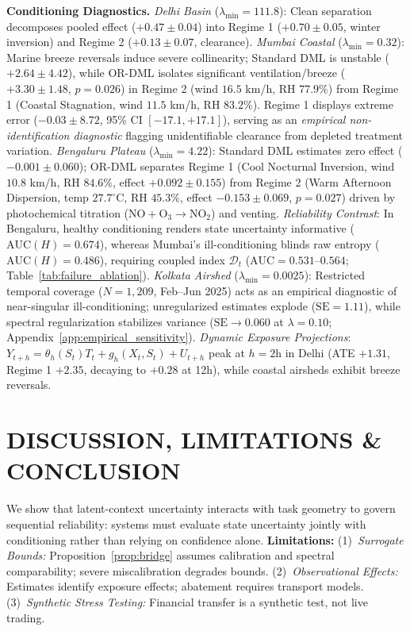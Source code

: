 \documentclass[twoside]{article}
\theoremstyle{definition}
\begin{document}
\textbf{Conditioning Diagnostics.} \emph{Delhi Basin} ($\lambda_{\min} = 111.8$): Clean separation decomposes pooled effect ($+0.47 \pm 0.04$) into Regime 1 ($+0.70 \pm 0.05$, winter inversion) and Regime 2 ($+0.13 \pm 0.07$, clearance). \emph{Mumbai Coastal} ($\lambda_{\min} = 0.32$): Marine breeze reversals induce severe collinearity; Standard DML is unstable ($+2.64 \pm 4.42$), while OR-DML isolates significant ventilation/breeze ($+3.30 \pm 1.48$, $p=0.026$) in Regime 2 (wind $16.5$ km/h, RH $77.9\%$) from Regime 1 (Coastal Stagnation, wind $11.5$ km/h, RH $83.2\%$). Regime 1 displays extreme error ($-0.03 \pm 8.72$, 95\% CI $[-17.1, +17.1]$), serving as an \emph{empirical non-identification diagnostic} flagging unidentifiable clearance from depleted treatment variation. \emph{Bengaluru Plateau} ($\lambda_{\min} = 4.22$): Standard DML estimates zero effect ($-0.001 \pm 0.060$); OR-DML separates Regime 1 (Cool Nocturnal Inversion, wind $10.8$ km/h, RH $84.6\%$, effect $+0.092 \pm 0.155$) from Regime 2 (Warm Afternoon Dispersion, temp $27.7^\circ$C, RH $45.3\%$, effect $-0.153 \pm 0.069$, $p=0.027$) driven by photochemical titration ($\text{NO} + \text{O}_3 \to \text{NO}_2$) and venting. \emph{Reliability Contrast}: In Bengaluru, healthy conditioning renders state uncertainty informative ($\text{AUC}(H) = 0.674$), whereas Mumbai's ill-conditioning blinds raw entropy ($\text{AUC}(H) = 0.486$), requiring coupled index $\mathcal{D}_t$ ($\text{AUC} = 0.531\text{--}0.564$; Table~\ref{tab:failure_ablation}). \emph{Kolkata Airshed} ($\lambda_{\min} = 0.0025$): Restricted temporal coverage ($N=1,209$, Feb--Jun 2025) acts as an empirical diagnostic of near-singular ill-conditioning; unregularized estimates explode ($\text{SE} = 1.11$), while spectral regularization stabilizes variance ($\text{SE} \to 0.060$ at $\lambda=0.10$; Appendix~\ref{app:empirical_sensitivity}). \emph{Dynamic Exposure Projections}: $Y_{t+h} = \theta_h(S_t) T_t + g_h(X_t, S_t) + U_{t+h}$ peak at $h=2$h in Delhi (ATE $+1.31$, Regime 1 $+2.35$, decaying to $+0.28$ at 12h), while coastal airsheds exhibit breeze reversals.

\vspace{-4.5mm}
\section{DISCUSSION, LIMITATIONS \& CONCLUSION}
\label{sec:conclusion}
We show that latent-context uncertainty interacts with task geometry to govern sequential reliability: systems must evaluate state uncertainty jointly with conditioning rather than relying on confidence alone. \textbf{Limitations:} (1)~\emph{Surrogate Bounds:} Proposition~\ref{prop:bridge} assumes calibration and spectral comparability; severe miscalibration degrades bounds. (2)~\emph{Observational Effects:} Estimates identify exposure effects; abatement requires transport models. (3)~\emph{Synthetic Stress Testing:} Financial transfer is a synthetic test, not live trading.
\end{document}
